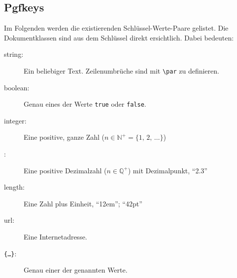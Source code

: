 		\subsection{Pgfkeys}
			Im Folgenden werden die existierenden Schlüssel-Werte-Paare gelistet. Die Dokumentklassen sind aus dem Schlüssel direkt ersichtlich. Dabei bedeuten:
			\begin{description}
				\item[string:] 
						Ein beliebiger Text. Zeilenumbrüche sind mit \verb|\par| zu definieren.
				\item[boolean:] 
						Genau eines der Werte \texttt{true} oder \texttt{false}.
				\item[integer:]
						Eine positive, ganze Zahl ($n \in \mathbb N^+ = \{1, \, 2, \, \ldots\}$)
				\item[\doubleplus:]
						Eine positive Dezimalzahl ($n \in \mathbb Q^+$) mit Dezimalpunkt, \zb "`2.3"'
				\item[length:]
						Eine Zahl plus Einheit, \zb "`12em"'; "`42pt"'
				\item[url:]
						Eine Internetadresse.
				\item[{\tt \{\ldots\}}:] 
						Genau einer der genannten Werte.
			\end{description}
			\newpage
